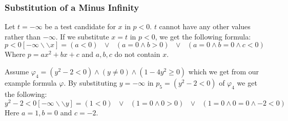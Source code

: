 \subsubsection{Substitution of a Minus Infinity}
	Let $t = -\infty$ be a test candidate for $x$ in $p<0$. $t$ cannot have any other values rather than $-\infty$. If we substitute $x = t$ in $p<0$, we get the following formula:
	$$p<0[-\infty\backslash\backslash x] = (a<0) \text{ } \vee \text{ } (a=0 \wedge b>0) \text{ } \vee \text{ } (a=0 \wedge b=0 \wedge c<0) $$
	Where $p=ax^{2}+bx+c$ and $a, b, c$ do not contain $x$.
	\begin{example}
		Assume $\varphi_{4} = (y^{2} - 2 < 0)\wedge (y \neq 0) \wedge (1-4y^{2}\geq 0)$ which we get from our example formula $\varphi$. By substituting $y=-\infty$ in $p_{5}=(y^{2} - 2 < 0)$ of $\varphi_{4}$ we get the following:
			$$ y^{2} - 2 < 0 [-\infty\backslash\backslash y] = (1<0)\text{ } \vee\text{ } (1=0 \wedge 0 > 0) \text{ } \vee \text{ } (1=0 \wedge 0=0 \wedge -2<0) $$
			Here $a=1, b=0$ and $c=-2$.
			\begin{center}
				
			\end{center}
	\end{example}
